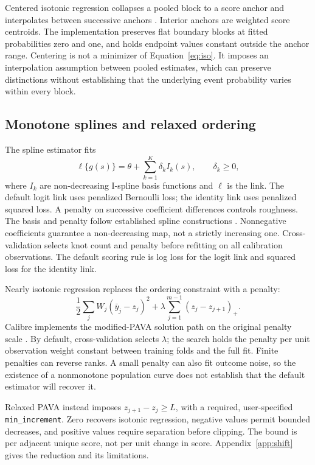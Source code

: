\documentclass[11pt]{article}
\begin{document}
Centered isotonic regression collapses a pooled block to a score anchor and interpolates between successive anchors \citep{oron2017centered}. Interior anchors are weighted score centroids. The implementation preserves flat boundary blocks at fitted probabilities zero and one, and holds endpoint values constant outside the anchor range. Centering is not a minimizer of Equation~\ref{eq:iso}. It imposes an interpolation assumption between pooled estimates, which can preserve distinctions without establishing that the underlying event probability varies within every block.

\newpage
\subsection{Monotone splines and relaxed ordering}

The spline estimator fits
\[
\ell\{g(s)\}=\theta+\sum_{k=1}^{K}\delta_k I_k(s),\qquad \delta_k\geq0,
\]
where $I_k$ are non-decreasing I-spline basis functions and $\ell$ is the link. The default logit link uses penalized Bernoulli loss; the identity link uses penalized squared loss. A penalty on successive coefficient differences controls roughness. The basis and penalty follow established spline constructions \citep{ramsay1988monotone,eilers1996flexible}. Nonnegative coefficients guarantee a non-decreasing map, not a strictly increasing one. Cross-validation selects knot count and penalty before refitting on all calibration observations. The default scoring rule is log loss for the logit link and squared loss for the identity link.

Nearly isotonic regression replaces the ordering constraint with a penalty:
\[
\frac12\sum_j W_j(\bar y_j-z_j)^2
+\lambda\sum_{j=1}^{m-1}(z_j-z_{j+1})_+.
\]
Calibre implements the modified-PAVA solution path on the original penalty scale \citep{tibshirani2011nearly}. By default, cross-validation selects $\lambda$; the search holds the penalty per unit observation weight constant between training folds and the full fit. Finite penalties can reverse ranks. A small penalty can also fit outcome noise, so the existence of a nonmonotone population curve does not establish that the default estimator will recover it.

Relaxed PAVA instead imposes $z_{j+1}-z_j\geq L$, with a required, user-specified \texttt{min\_increment}. Zero recovers isotonic regression, negative values permit bounded decreases, and positive values require separation before clipping. The bound is per adjacent unique score, not per unit change in score. Appendix~\ref{app:shift} gives the reduction and its limitations.
\end{document}
